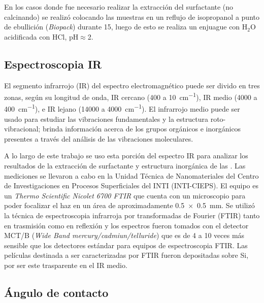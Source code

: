 		En los casos donde fue necesario realizar la extracción del surfactante (no calcinando) se realizó colocando las muestras en un reflujo de isopropanol a punto de ebullición (\textit{Biopack}) durante \SI{15}{\min}, luego de esto se realiza un enjuague con H$_2$O acidificada con HCl, pH$\approx$2.
			  
	\subsection{Espectroscopia IR}\label{sec:IR}

		El segmento infrarrojo (IR) del  espectro electromagnético puede ser divido en tres zonas, según su longitud de onda, IR cercano (400 a \SI{10}{\cm^{-1}}), IR medio (4000 a \SI{400}{\cm^{-1}}), e IR lejano (14000 a \SI{4000}{\cm^{-1}}). El infrarrojo medio puede ser usado para estudiar las vibraciones fundamentales y la estructura roto-vibracional; brinda información acerca de los grupos orgánicos e inorgánicos  presentes a través del análisis de las vibraciones moleculares.\cite{Atkins2006,Barrow1962,Stuart2004} 
		
		A lo largo de este trabajo se uso esta porción del espectro IR para analizar los resultados de la extracción de surfactante y estructura inorgánica de las \pdm. Las mediciones se llevaron a cabo en la Unidad Técnica de Nanomateriales del Centro de Investigaciones en Procesos Superficiales del INTI (INTI-CIEPS). El equipo es un \textit{Thermo Scientific Nicolet 6700 FTIR} que cuenta con un microscopio para poder focalizar el haz en un área de aproximadamente \SI{0.5x0.5}{\mm}. Se utilizó la técnica de espectroscopia infrarroja por transformadas de Fourier (FTIR) tanto en trasmisión como en reflexión y los espectros fueron tomados con el detector MCT/B (\textit{Wide Band mercury/cadmiun/telluride}) que es de 4 a 10 veces más sensible que los detectores estándar para equipos de espectroscopia FTIR.\cite{Nicholet2007} Las películas destinada a ser caracterizadas por FTIR fueron depositadas sobre Si, por ser este trasparente en el IR medio.

	\subsection{Ángulo de contacto}

